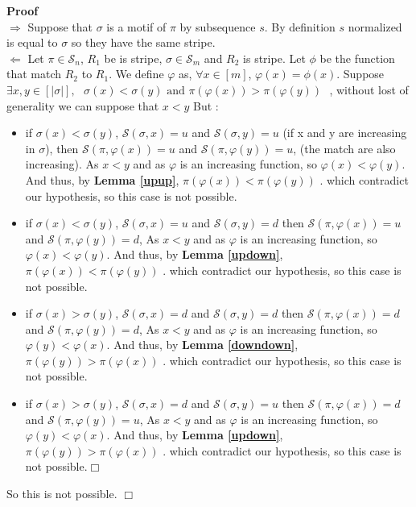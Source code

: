 \documentclass[12pt, a4paper]{article}
\newcommand{\Perm}[1]{\mathcal{S}_{#1}}
\newcommand{\ptext}{\pi}
\newcommand{\pmotif}{\sigma}
\newcommand{\dstep}{d}
\newcommand{\ustep}{u}
\begin{document}
		\textbf{Proof} \\
		$\Rightarrow$ Suppose that $\pmotif$ is a motif of $\ptext$
		by subsequence $s$.
		By definition $s$ normalized is equal to
		$\pmotif$ so they have the same stripe.\\ 
		$\Leftarrow$ 
		Let $\ptext \in \Perm{n}$, 
		$R_1$ be is stripe, 
		$\pmotif \in \Perm{m}$
		and $R_2$ is stripe.
		Let $\phi$ be the function
		that match $R_2$ to $R_1$.
		We define $\varphi$ as, 
		$\forall x \in [m]$,
		$\varphi(x) = \phi(x)$.
		Suppose\\ $\exists x,y \in [|\pmotif|], \text{ $\pmotif(x)<\pmotif(y)$ 
		and $\ptext(\varphi(x))>\ptext(\varphi(y))$ }$,
		without lost of generality we can suppose that $x<y$
		But :
		\begin{itemize}
		
			\item if $\pmotif(x)<\pmotif(y)$, 
			$\mathcal{S}(\pmotif,x)=\ustep$ 
			and $\mathcal{S}(\pmotif,y)=\ustep$
			(if x and y are increasing in $\pmotif$),
			then $\mathcal{S}(\ptext,\varphi(x))=\ustep$ and $\mathcal{S}(\ptext,\varphi(y))=\ustep$,
			(the match are also increasing).
			As $x<y$ and as $\varphi$ is an increasing function, 
			so $\varphi(x) < \varphi(y)$.
			And thus, by \textbf{Lemma \ref{upup}},
			$\ptext(\varphi(x)) < \ptext(\varphi(y))$ .
			which contradict our hypothesis,
			so this case is not possible.
		
			\item if $\pmotif(x)<\pmotif(y)$, 
			$\mathcal{S}(\pmotif,x)=\ustep$ 
			and $\mathcal{S}(\pmotif,y)=\dstep$
			then $\mathcal{S}(\ptext,\varphi(x))=\ustep$ and $\mathcal{S}(\ptext,\varphi(y))=\dstep$,
			As $x<y$ and as $\varphi$ is an increasing function, 
			so $\varphi(x) < \varphi(y)$.
			And thus, by \textbf{Lemma \ref{updown}},
			$\ptext(\varphi(x)) < \ptext(\varphi(y))$ .
			which contradict our hypothesis,
			so this case is not possible.			

			\item if $\pmotif(x)>\pmotif(y)$, 
			$\mathcal{S}(\pmotif,x)=\dstep$ 
			and $\mathcal{S}(\pmotif,y)=\dstep$
			then $\mathcal{S}(\ptext,\varphi(x))=\dstep$ and $\mathcal{S}(\ptext,\varphi(y))=\dstep$,
			As $x<y$ and as $\varphi$ is an increasing function, 
			so $\varphi(y) < \varphi(x)$.
			And thus, by \textbf{Lemma \ref{downdown}},
			$\ptext(\varphi(y)) > \ptext(\varphi(x))$ .
			which contradict our hypothesis,
			so this case is not possible.
			
			\item if $\pmotif(x)>\pmotif(y)$, 
			$\mathcal{S}(\pmotif,x)=\dstep$ 
			and $\mathcal{S}(\pmotif,y)=\ustep$
			then $\mathcal{S}(\ptext,\varphi(x))=\dstep$ and $\mathcal{S}(\ptext,\varphi(y))=\ustep$,
			As $x<y$ and as $\varphi$ is an increasing function, 
			so $\varphi(y) < \varphi(x)$.
			And thus, by \textbf{Lemma \ref{updown}},
			$\ptext(\varphi(y)) > \ptext(\varphi(x))$ .
			which contradict our hypothesis,
			so this case is not possible.$\Box$
			
			
		\end{itemize}
		So this is not possible. $\Box$\\
		
\end{document}
